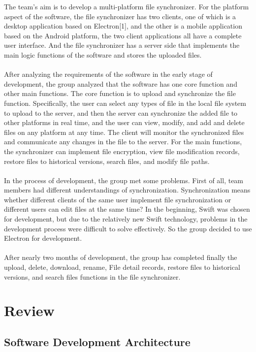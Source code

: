 \documentclass[11pt]{article}
\begin{document}
The team’s aim is to develop a multi-platform file synchronizer. For the platform aspect of the software, the file synchronizer has two clients, one of which is a desktop application based on Electron{[}1{]}, and the other is a mobile application based on the Android platform, the two client applications all have a complete user interface. And the file synchronizer has a server side that implements the main logic functions of the software and stores the uploaded files.
\\
\\
After analyzing the requirements of the software in the early stage of development, the group analyzed that the software has one core function and other main functions. The core function is to upload and synchronize the file function. Specifically, the user can select any types of file in the local file system to upload to the server, and then the server can synchronize the added file to other platforms in real time, and the user can view, modify, and add and delete files on any platform at any time. The client will monitor the synchronized files and communicate any changes in the file to the server. For the main functions, the synchronizer can implement file encryption, view file modification records, restore files to historical versions, search files, and modify file paths.
\\
\\
In the process of development, the group met some problems. First of all, team members had different understandings of synchronization. Synchronization means whether different clients of the same user implement file synchronization or different users can edit files at the same time? In the beginning, Swift was chosen for development, but due to the relatively new Swift technology, problems in the development process were difficult to solve effectively. So the group decided to use Electron for development. 
\\
\\
After nearly two months of development, the group has completed finally the upload, delete, download, rename, File detail records, restore files to historical versions, and search files functions in the file synchronizer.


\clearpage
\section{Review}
\subsection{Software Development Architecture}
\end{document}
